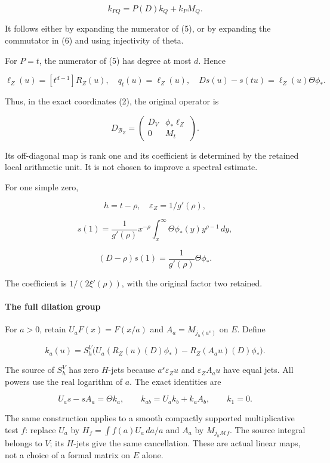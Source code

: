 \[\boxed{k_{PQ}=P(D)k_Q+k_PM_Q.}\tag{7}\]

It follows either by expanding the numerator of (5), or by expanding the commutator in (6) and using
injectivity of theta.

For \(P=t\), the numerator of (5) has degree at most \(d\). Hence

\[\ell_Z(u)=[t^{d-1}]R_Z(u),\quad q_t(u)=\ell_Z(u),\quad
\boxed{Ds(u)-s(tu)=\ell_Z(u)\Theta\phi_*.}\tag{8}\]

Thus, in the exact coordinates (2), the original operator is

\[\boxed{D_{\mathscr B_Z}=
\begin{pmatrix}D_V&\phi_*\ell_Z\\0&M_t\end{pmatrix}.}\tag{9}\]

Its off-diagonal map is rank one and its coefficient is determined by the retained local arithmetic
unit. It is not chosen to improve a spectral estimate.

For one simple zero,

\[h=t-\rho,\quad \varepsilon_Z=1/g'(\rho),\]

\[s(1)=\frac1{g'(\rho)}x^{-\rho}\int_x^\infty\Theta\phi_*(y)y^{\rho-1}\,dy,\]

\[\boxed{(D-\rho)s(1)=\frac1{g'(\rho)}\Theta\phi_*.}\tag{10}\]

The coefficient is \(1/(2\xi'(\rho))\), with the original factor two retained.

\paragraph{The full dilation group}\label{pr_9:the-full-dilation-group}

For \(a>0\), retain \(U_aF(x)=F(x/a)\) and \(A_a=M_{j_h(a^s)}\) on \(E\). Define

\[k_a(u)=S_h^V\bigl(U_a(R_Z(u)(D)\phi_*)-R_Z(A_au)(D)\phi_*\bigr).\tag{11}\]

The source of \(S_h^V\) has zero \(H\)-jets because \(a^s\varepsilon_Zu\) and \(\varepsilon_ZA_au\)
have equal jets. All powers use the real logarithm of \(a\). The exact identities are

\[U_as-sA_a=\Theta k_a,\qquad
k_{ab}=U_ak_b+k_aA_b,\qquad k_1=0.\tag{12}\]

The same construction applies to a smooth compactly supported multiplicative test \(f\): replace
\(U_a\) by \(H_f=\int f(a)U_a\,da/a\) and \(A_a\) by \(M_{j_h\mathcal Mf}\). The source integral
belongs to \(V\); its \(H\)-jets give the same cancellation. These are actual linear maps, not a
choice of a formal matrix on \(E\) alone.

